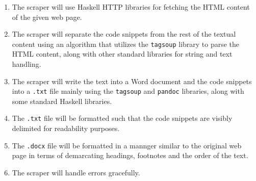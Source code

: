 \documentclass{scrreprt}
\begin{document}
\begin{enumerate}
    \item The scraper will use Haskell HTTP libraries for fetching the HTML content of the given web page.
    \item The scraper will separate the code snippets from the rest of the textual content using an algorithm that utilizes the \texttt{tagsoup} library to parse the HTML content, along with other standard libraries for string and text handling.
    \item The scraper will write the text into a Word document and the code snippets into a \texttt{.txt} file mainly using the \texttt{tagsoup} and \texttt{pandoc} libraries, along with some standard Haskell libraries.
    \item The \texttt{.txt} file will be formatted such that the code snippets are visibly delimited for readability purposes.
    \item The \texttt{.docx} file will be formatted in a mannger similar to the original web page in terms of demarcating headings, footnotes and the order of the text. 
    \item The scraper will handle errors gracefully.
\end{enumerate}




\end{document}
